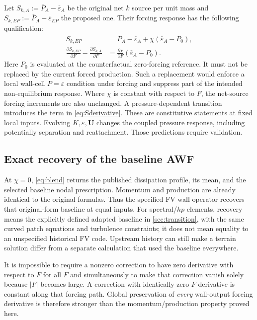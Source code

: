 \documentclass[11pt,a4paper]{article}
\numberwithin{equation}{section}
\newcommand{\eps}{\varepsilon}
\newcommand{\avg}[1]{\overline{#1}}
\begin{document}
Let $S_{k,A}:=\avg P_A-\avg\eps_A$ be the original net $k$ source
per unit mass and $S_{k,EP}:=\avg P_A-\avg\eps_{EP}$ the proposed
one. Their forcing response has the following qualification:
\begin{align}
 S_{k,EP}
 &=\avg P_A-\avg\eps_A+\chi(\avg\eps_A-P_0),
 \label{eq:Sblend}\\
 \frac{\partial S_{k,EP}}{\partial F}
 -\frac{\partial S_{k,A}}{\partial F}
 &=\frac{\partial\chi}{\partial F}(\avg\eps_A-P_0).
 \label{eq:Sderivative}
\end{align}
Here $P_0$ is evaluated at the counterfactual zero-forcing reference.
It must not be replaced by the current forced production. Such a
replacement would enforce a local wall-cell $P=\eps$ condition under
forcing and suppress part of the intended non-equilibrium response.
Where $\chi$ is constant with respect to $F$, the net-source
forcing increments are also unchanged. A pressure-dependent transition
introduces the term in \cref{eq:Sderivative}.
These are constitutive statements at fixed local inputs. Evolving
$K,\eps,\bm U$ changes the coupled pressure response, including potentially
separation and reattachment. Those predictions require validation.

\subsection{Exact recovery of the baseline AWF}
At $\chi=0$, \cref{eq:blend} returns the published dissipation profile,
its mean, and the selected baseline nodal prescription. Momentum and
production are already identical to the original formulas.
Thus the specified FV wall operator recovers that original-form
baseline at equal inputs. For spectral/$hp$ elements, recovery means the
explicitly defined adapted baseline in \cref{sec:transition}, with the
same curved patch equations and turbulence constraints; it does not mean equality to an
unspecified historical FV code. Upstream history can still make a terrain solution differ
from a separate calculation that used the baseline everywhere.

It is impossible to require a nonzero correction to have zero derivative
with respect to $F$ for all $F$ and simultaneously to make that correction
vanish solely because $|F|$ becomes large. A correction with identically
zero $F$ derivative is constant along that forcing path. Global preservation
of \emph{every} wall-output forcing derivative is therefore stronger than
the momentum/production property proved here.
\end{document}
